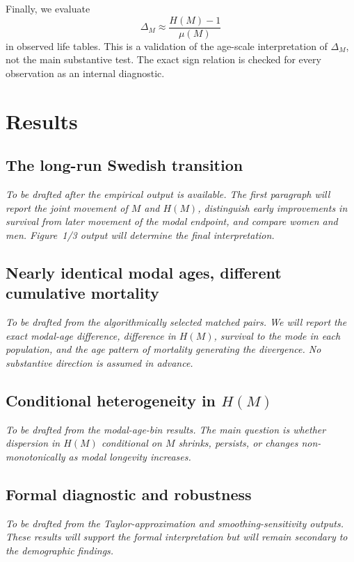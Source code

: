 \documentclass[doublespace]{interact}
\begin{document}
Finally, we evaluate
\begin{equation}
\Delta_M\approx\frac{H(M)-1}{\mu(M)}
\end{equation}
in observed life tables. This is a validation of the age-scale interpretation of $\Delta_M$, not the main substantive test. The exact sign relation is checked for every observation as an internal diagnostic.

\section{Results}

\subsection{The long-run Swedish transition}

\textit{To be drafted after the empirical output is available. The first paragraph will report the joint movement of $M$ and $H(M)$, distinguish early improvements in survival from later movement of the modal endpoint, and compare women and men. Figure~1/3 output will determine the final interpretation.}

\subsection{Nearly identical modal ages, different cumulative mortality}

\textit{To be drafted from the algorithmically selected matched pairs. We will report the exact modal-age difference, difference in $H(M)$, survival to the mode in each population, and the age pattern of mortality generating the divergence. No substantive direction is assumed in advance.}

\subsection{Conditional heterogeneity in $H(M)$}

\textit{To be drafted from the modal-age-bin results. The main question is whether dispersion in $H(M)$ conditional on $M$ shrinks, persists, or changes non-monotonically as modal longevity increases.}

\subsection{Formal diagnostic and robustness}

\textit{To be drafted from the Taylor-approximation and smoothing-sensitivity outputs. These results will support the formal interpretation but will remain secondary to the demographic findings.}
\end{document}
